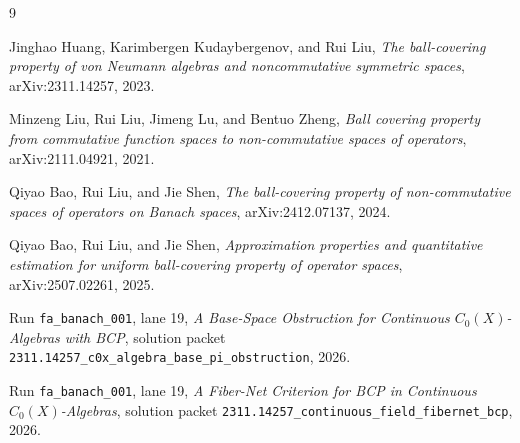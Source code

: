 \documentclass[11pt]{article}
\begin{document}
\begin{thebibliography}{9}

Jinghao Huang, Karimbergen Kudaybergenov, and Rui Liu,
\emph{The ball-covering property of von Neumann algebras and noncommutative
symmetric spaces},
arXiv:2311.14257, 2023.

Minzeng Liu, Rui Liu, Jimeng Lu, and Bentuo Zheng,
\emph{Ball covering property from commutative function spaces to
non-commutative spaces of operators},
arXiv:2111.04921, 2021.

Qiyao Bao, Rui Liu, and Jie Shen,
\emph{The ball-covering property of non-commutative spaces of operators on
Banach spaces},
arXiv:2412.07137, 2024.

Qiyao Bao, Rui Liu, and Jie Shen,
\emph{Approximation properties and quantitative estimation for uniform
ball-covering property of operator spaces},
arXiv:2507.02261, 2025.

Run \texttt{fa\_banach\_001}, lane 19,
\emph{A Base-Space Obstruction for Continuous \(C_0(X)\)-Algebras with BCP},
solution packet
\texttt{2311.14257\_c0x\_algebra\_base\_pi\_obstruction}, 2026.

Run \texttt{fa\_banach\_001}, lane 19,
\emph{A Fiber-Net Criterion for BCP in Continuous \(C_0(X)\)-Algebras},
solution packet
\texttt{2311.14257\_continuous\_field\_fibernet\_bcp}, 2026.

\end{thebibliography}
\end{document}
